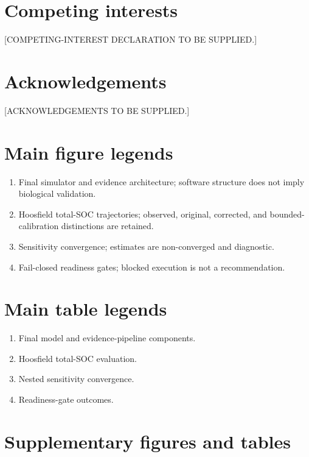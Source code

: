 \documentclass[11pt]{article}
\begin{document}
\section{Competing interests}
[COMPETING-INTEREST DECLARATION TO BE SUPPLIED.]

\section{Acknowledgements}
[ACKNOWLEDGEMENTS TO BE SUPPLIED.]




\section{Main figure legends}
\begin{enumerate}[label=\textbf{Figure \arabic*.}]
\item Final simulator and evidence architecture; software structure does not imply biological validation.
\item Hoosfield total-SOC trajectories; observed, original, corrected, and bounded-calibration distinctions are retained.
\item Sensitivity convergence; estimates are non-converged and diagnostic.
\item Fail-closed readiness gates; blocked execution is not a recommendation.
\end{enumerate}

\section{Main table legends}
\begin{enumerate}[label=\textbf{Table \arabic*.}]
\item Final model and evidence-pipeline components.
\item Hoosfield total-SOC evaluation.
\item Nested sensitivity convergence.
\item Readiness-gate outcomes.
\end{enumerate}

\clearpage
\appendix
\section{Supplementary figures and tables}
\setcounter{figure}{0}
\renewcommand{\thefigure}{S\arabic{figure}}
\setcounter{table}{0}
\renewcommand{\thetable}{S\arabic{table}}
\end{document}
